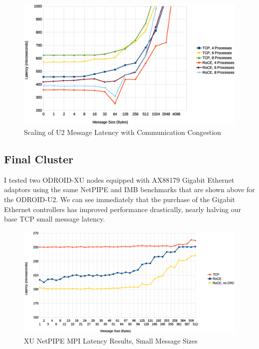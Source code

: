 \documentclass[11pt]{book}
\begin{document}
\begin{figure}[h]
\includegraphics[width=\textwidth]{pingpong_multi_zoom}
\caption{Scaling of U2 Message Latency with Communication Congestion}
\label{multipingpong-u2}
\end{figure}

\subsection{\textbf{Final Cluster}}

I tested two ODROID-XU nodes equipped with AX88179 Gigabit Ethernet adaptors
using the same NetPIPE and IMB benchmarks that are shown above for the
ODROID-U2. We can see immediately that the purchase of the Gigabit Ethernet
controllers has improved performance drastically, nearly halving our base TCP
small message latency.

\begin{figure}[h]
\includegraphics[width=\textwidth]{xu_lat_small}
\caption{XU NetPIPE MPI Latency Results, Small Message Sizes}
\label{xu-lat-small}
\end{figure}
\end{document}
